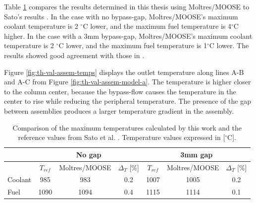 Table \ref{tab:th-val-assem-results} compares the results determined in this thesis using Moltres/MOOSE to Sato's results \cite{sato_computational_2010}.
In the case with no bypass-gap, Moltres/MOOSE's maximum coolant temperature is 2 $^{\circ}$C lower, and the maximum fuel temperature is 4$^{\circ}$C higher.
In the case with a 3mm bypass-gap, Moltres/MOOSE's maximum coolant temperature is 2 $^{\circ}$C lower, and the maximum fuel temperature is 1$^{\circ}$C lower.
The results showed good agreement with those in \cite{sato_computational_2010}.

Figure \ref{fig:th-val-assem-temps} displays the outlet temperature along lines A-B and A-C from Figure \ref{fig:th-val-assem-model-a}.
The temperature is higher closer to the column center, because the bypass-flow causes the temperature in the center to rise while reducing the peripheral temperature.
The presence of the gap between assemblies produces a larger temperature gradient in the assembly.

\begin{table}[htbp!]
  \centering
  \caption{Comparison of the maximum temperatures calculated by this work and the reference values from Sato et al. \cite{sato_computational_2010}. Temperature values expressed in [$^{\circ}$C].}
  \label{tab:th-val-assem-results}
\begin{tabular}{lcccccc}
\toprule
        & \multicolumn{3}{c}{No gap} & \multicolumn{3}{c}{3mm gap} \\
\midrule
        & $T_{ref}$ & Moltres/MOOSE  & $\Delta_T$ [\%] & $T_{ref}$ & Moltres/MOOSE & $\Delta_T$ [\%] \\
\midrule
Coolant & 985       & 983   & 0.2    & 1007      & 1005 & 0.2   \\  
Fuel    & 1090      & 1094  & 0.4    & 1115      & 1114 & 0.1   \\
\bottomrule
\end{tabular}
\end{table}


